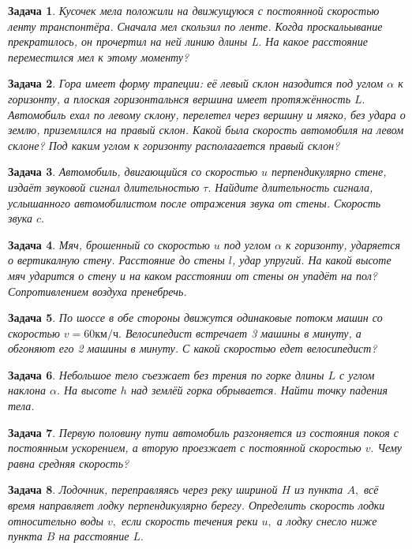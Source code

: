 \documentclass[a5paper,11pt]{article}
\newtheorem{task}{Задача}
\begin{document}
\begin{task}
Кусочек мела положили на движущуюся с постоянной скоростью ленту транспонтёра. Сначала мел скользил по ленте.
Когда проскальывание прекратилось, он прочертил на ней линию длины L. На какое расстояние переместился мел к этому
моменту?
\label{task:k-06-1}
\end{task}
\begin{task}
Гора имеет форму трапеции: её левый склон назодится под углом $\alpha$ к горизонту, а плоская горизонтальнся вершина
имеет протяжённость $L.$ Автомобиль ехал по левому склону, перелетел через вершину и мягко, без удара о
землю, приземлился на правый склон. Какой была скорость автомобиля на левом склоне? Под каким углом к горизонту
располагается правый склон?
\label{task:k-06-2}
\end{task}
\begin{task}
Автомобиль, двигающийся со скоростью $u$ перпендикулярно стене, издаёт звуковой сигнал
длительностью $\tau.$ Найдите длительность сигнала, услышанного автомобилистом
после отражения звука от стены. Скорость звука $c.$
\label{task:k-07-1-8}
\end{task}
\begin{task}
Мяч, брошенный со скоростью $u$ под углом $\alpha$ к горизонту, ударяется о вертикалную стену.
Расстояние до стены $l$, удар упругий. На какой высоте мяч ударится о стену и на каком расстоянии от
стены он упадёт на пол? Сопротивлением воздуха пренебречь.
\label{task:k-07-4-8}
\end{task}
\begin{task}
По шоссе в обе стороны движутся одинаковые потокм машин со скоростью $v=60\text{км/ч}.$
Велосипедист встречает 3 машины в минуту, а обгоняют его 2 машины в минуту. С какой скоростью
едет велосипедист?
\label{task:k-08-1-9}
\end{task}
\begin{task}
Небольшое тело съезжает без трения по горке длины $L$ с углом наклона $\alpha.$ На высоте
$h$ над землёй горка обрывается. Найти точку падения тела.
\label{task:k-08-2-9}
\end{task}
\begin{task}
Первую половину пути автомобиль разгоняется из состояния покоя с постоянным ускорением, а вторую проезжает
с постоянной скоростью $v.$ Чему равна средняя скорость?
\label{task:k-08-1-10}
\end{task}
\begin{task}
Лодочник, переправляясь через реку шириной $H$ из пункта $A,$ всё время направляет
лодку перпендикулярно берегу. Определить скорость лодки относительно воды $v,$ если скорость
течения реки $u,$ а лодку снесло ниже пункта $B$ на расстояние $L.$
\label{task:k-09-1-9}
\end{task}
\end{document}
